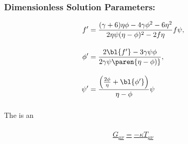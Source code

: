 \begin{frame}\frametitle{Dimensionless Solution Parameters: }
\href{\urlTaylora\#page=6}{
\begin{align}
%
	f' &= \frac{ (\gamma +6) \eta  \phi -4 \gamma  \phi ^2-6 \eta ^2} {2 \eta  \psi  (\eta -\phi )^2-2 f \eta } f\psi , \\[10pt]
%
	\phi' &= \frac{2 \bl{f'}-3 \gamma  \psi  \phi }{2 \gamma   \psi \paren{\eta - \phi) }}, \\[10pt]
%
	\psi' &= \frac{ \left(\frac{2 \phi }{\eta }+ \bl{\phi'} \right)}{\eta -\phi }\psi 
%
\end{align}}
\end{frame}



%
\begin{frame}\frametitle{\WikiEFE}
\center
The  is an 
\end{frame}
%
%
\begin{frame}\frametitle{\WikiEFE}
\href{https://mathworld.wolfram.com/EinsteinFieldEquations.html}{
\begin{equation}
G_{\mu\nu} = - \kappa T_{\mu\nu}
\label{eq:einstein-equations}
\end{equation}
}
\end{frame}


